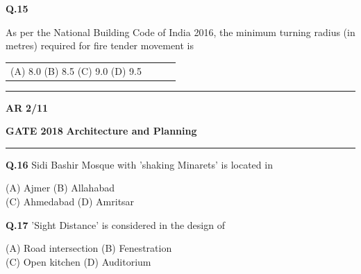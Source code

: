 \documentclass[journal,12pt,onecolumn]{IEEEtran}
\theoremstyle{remark}
\begin{document}
\noindent \textbf{Q.15} \hspace{0.5cm} \parbox[t]{14cm}{ As per the National Building Code of India 2016, the minimum turning radius (in metres) required for fire tender movement is }

\vspace{0.6cm}
\begin{tabular}{llll}

     \hspace{1cm}  (A) 8.0 \hspace{3cm}  (B) 8.5 \hspace{3cm} (C) 9.0 \hspace{3cm}  (D) 9.5
     
\end{tabular}
\vspace{0.5cm}
\noindent
\hrule \vspace{0.0875CM} \textbf{AR} \hfill  \textbf{2/11}

 
 
\newpage


\noindent
\textbf{GATE 2018} \hfill \textbf{Architecture and Planning}
\vspace{0.0012cm} \hrule
 
\vspace{0.15cm}

\textbf{Q.16} \hspace{0.3cm} Sidi Bashir Mosque with 'shaking Minarets' is located in

\begin{flushleft} 

\hspace{1.8cm}   (A) Ajmer \hspace{3.6cm}  (B) Allahabad \\
\hspace{1.8cm}   (C) Ahmedabad \hspace{2.7cm} (D) Amritsar 
\end{flushleft}

\vspace{0.5cm}

\textbf{Q.17} \hspace{0.3cm} 'Sight Distance' is considered in the design of

\begin{flushleft}
    

\hspace{1.8cm}(A) Road intersection \hspace{2.0455cm} (B) Fenestration \\
\hspace{1.8cm}(C) Open kitchen \hspace{2.7cm} (D) Auditorium 
\end{flushleft}
\end{document}
